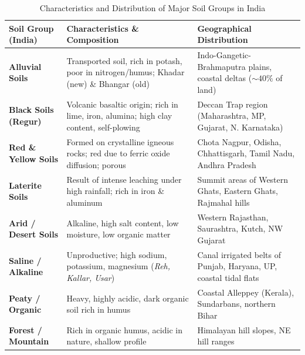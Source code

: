 \documentclass[11pt,a4paper]{article}
\begin{document}
\begin{table}[h!]
\centering
\small
\begin{tabularx}{\textwidth}{l X X}
\toprule
\textbf{Soil Group (India)} & \textbf{Characteristics \& Composition} & \textbf{Geographical Distribution} \\
\midrule
\textbf{Alluvial Soils} & Transported soil, rich in potash, poor in nitrogen/humus; Khadar (new) \& Bhangar (old) & Indo-Gangetic-Brahmaputra plains, coastal deltas ($\sim 40\%$ of land) \\
\textbf{Black Soils (Regur)} & Volcanic basaltic origin; rich in lime, iron, alumina; high clay content, self-plowing & Deccan Trap region (Maharashtra, MP, Gujarat, N. Karnataka) \\
\textbf{Red \& Yellow Soils} & Formed on crystalline igneous rocks; red due to ferric oxide diffusion; porous & Chota Nagpur, Odisha, Chhattisgarh, Tamil Nadu, Andhra Pradesh \\
\textbf{Laterite Soils} & Result of intense leaching under high rainfall; rich in iron \& aluminum & Summit areas of Western Ghats, Eastern Ghats, Rajmahal hills \\
\textbf{Arid / Desert Soils} & Alkaline, high salt content, low moisture, low organic matter & Western Rajasthan, Saurashtra, Kutch, NW Gujarat \\
\textbf{Saline / Alkaline} & Unproductive; high sodium, potassium, magnesium (\textit{Reh, Kallar, Usar}) & Canal irrigated belts of Punjab, Haryana, UP, coastal tidal flats \\
\textbf{Peaty / Organic} & Heavy, highly acidic, dark organic soil rich in humus & Coastal Alleppey (Kerala), Sundarbans, northern Bihar \\
\textbf{Forest / Mountain} & Rich in organic humus, acidic in nature, shallow profile & Himalayan hill slopes, NE hill ranges \\
\bottomrule
\end{tabularx}
\caption{Characteristics and Distribution of Major Soil Groups in India}
\end{table}
\end{document}
